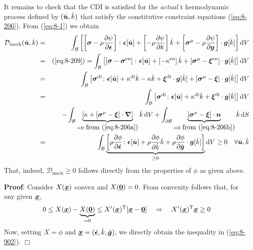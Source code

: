 It remains to check that the CDI is satisfied for the \emph{actual} t
hermodynamic process defined by $(\dot{\bm {u}},\dot{k})$ that satisfy the
 constitutive constraint equations (\ref{eq:8-206}). From (\ref{eq:8-1})
  we obtain
\begin{eqnarray}
    {\mathcal D}_{\mathrm{mech}}(\dot{\bm {u}},\dot{k})
    &=&
    \int_{\mathcal{B}}  \left[\left[\bm{\sigma} -\rho\frac{\partial \psi}{\partial \bm{\epsilon}}\right] 
    \colon \bm{\epsilon}[\dot{\bm {u}}] + \left[- \rho\frac{\partial \psi}{\partial k}\right] \dot{k}
     + \left[\bm{\sigma}^{\mathrm{\mu}} -\rho\frac{\partial \psi}{\partial \bm {g}}\right] \cdot \bm {g}[\dot{k}] \right]  \mathop{}\!\mathrm{d} V
    \nonumber \\
    &=& (\ref{eq:8-209}) =
    \int_{\mathcal{B}}  \left[\left[\bm{\sigma} -\bm{\sigma}^{\mathrm{en}} \right] \colon \bm{\epsilon}[\dot{\bm {u}}] +
     \left[-\kappa^{\mathrm{en}} \right] \dot{k} + \left[\bm{\sigma}^{\mathrm{\mu}} - \bm{\xi}^{\mathrm{en}} \right]
      \cdot \bm {g}[\dot{k}] \right]  \mathop{}\!\mathrm{d} V
    \nonumber \\
    &=&
    \int_{\mathcal{B}}  \left[\bm{\sigma}^{\mathrm{di}} \colon \bm{\epsilon}[\dot{\bm {u}}] + \kappa^{\mathrm{di}} \dot{k} - 
    \kappa\dot{k} + \bm{\xi}^{\mathrm{di}} \cdot\bm {g}[\dot{k}] + \left[\bm{\sigma}^{\mathrm{\mu}} -
    \bm{\xi}\right]\cdot\bm {g}[\dot{k}] \right]  \mathop{}\!\mathrm{d} V
    \nonumber \\
    &=&
    \int_{\mathcal{B}}  \left[\bm{\sigma}^{\mathrm{di}} \colon \bm{\epsilon}[\dot{\bm {u}}] + \kappa^{\mathrm{di}}  \dot{k} + 
    \bm{\xi}^{\mathrm{di}}  \cdot \bm {g}[\dot{k}] \right]  \mathop{}\!\mathrm{d} V
    \nonumber \\
    &&- \int_{\mathcal{B}}  \underbrace{\left[\kappa + \left[\bm{\sigma}^{\mathrm{\mu}} - \bm{\xi}\right] 
    \cdot {\bm\nabla}\right]}_{=0 \mbox{ from (\ref{eq:8-206a})}}\dot{k}  \mathop{}\!\mathrm{d} V
    + \int_{\partial \mathcal{B}}  \underbrace{\left[\bm{\sigma}^{\mathrm{\mu}} - \bm{\xi}\right]
    \cdot\bm{n}}_{=0 \mbox{ from (\ref{eq:8-206b})}} \dot{k}  \mathop{}\!\mathrm{d} S
    \nonumber \\
    &=&
    \int_{\mathcal{B}}  \underbrace{\left[\rho\frac{\partial \phi}{\partial \dot{\bm{\epsilon}}}\colon 
    \bm{\epsilon}[\dot{\bm {u}}]+ \rho\frac{\partial \phi}{\partial \dot{k}} \dot{k} + \rho\frac{\partial \phi}{\partial \dot{\bm {g}}} 
    \cdot \bm {g}[\dot{k}] \right]}_{\geq 0}  \mathop{}\!\mathrm{d} V
    \geq 0
    \quad \forall \dot{\bm {u}},\dot{k}
\label{eq:8-902}
\end{eqnarray}
That, indeed, ${\mathcal D}_{\mathrm{mech}}\geq 0$ follows directly 
from the properties of $\phi$ as given above.

\textbf{Proof}: Consider $X(\underline{\mbox{\boldmath $x$}})$ convex and $X(\underline{\mbox{\boldmath $0$}})=0$. From 
convexity follows that, for any given $\underline{\mbox{\boldmath $x$}}$,
\begin{equation}
    0 \leq X(\underline{\mbox{\boldmath $x$}}) - \underbrace{X(\underline{\mbox{\boldmath $0$}})}_{=0} 
    \leq X'(\underline{\mbox{\boldmath $x$}})^{\mathrm{T}}[\underline{\mbox{\boldmath $x$}} -\underline{\mbox{\boldmath $0$}}] 
    \quad \Rightarrow \quad X'(\underline{\mbox{\boldmath $x$}})^{\mathrm{T}}\underline{\mbox{\boldmath $x$}}\geq 0
\label{eq:8-202}
\end{equation}
Now, setting $X=\phi$ and $\underline{\mbox{\boldmath $x$}}=(\dot{\bm{\epsilon}},\dot{k},\dot{\bm {g}})$, we directly 
obtain the inequality in (\ref{eq:8-902}). $\Box$

